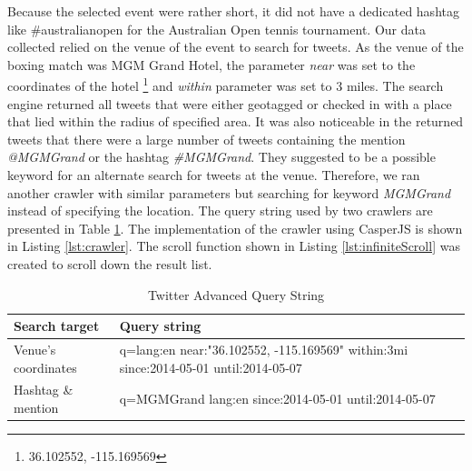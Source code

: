Because the selected event were rather short, it did not have a dedicated hashtag like \#australianopen for the Australian Open tennis tournament. Our data collected relied on the venue of the event to search for tweets. As the venue of the boxing match was MGM Grand Hotel, the parameter \textit{near} was set to the coordinates of the hotel \footnote{36.102552, -115.169569} and \textit{within} parameter was set to 3 miles. The search engine returned all tweets that were either geotagged or checked in with a place that lied within the radius of specified area. It was also noticeable in the returned tweets that there were a large number of tweets containing the mention \textit{@MGMGrand} or the hashtag \textit{\#MGMGrand}. They suggested to be a possible keyword for an alternate search for tweets at the venue. Therefore, we ran another crawler with similar parameters but searching for keyword \textit{MGMGrand} instead of specifying the location. The query string used by two crawlers are presented in Table \ref{table:crawlerURL}. The implementation of the crawler using CasperJS is shown in Listing \ref{lst:crawler}. The scroll function shown in Listing \ref{lst:infiniteScroll} was created to scroll down the result list.

\begin{table}[!h]
\caption{Twitter Advanced Query String}
\label{table:crawlerURL}
\centering
\begin{tabular}{|p{3.5cm}|p{11cm}|}

\hline
\textbf{Search target} & \textbf{Query string} \\ \hline \hline
Venue's coordinates & q=lang:en near:"36.102552, -115.169569" within:3mi since:2014-05-01 until:2014-05-07 \\ \hline
Hashtag \& mention & q=MGMGrand lang:en since:2014-05-01 until:2014-05-07 \\ \hline

\end{tabular}
\end{table}

